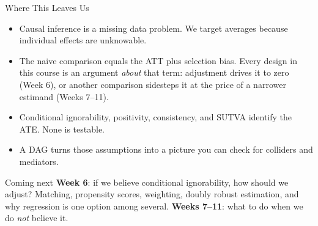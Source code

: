 \documentclass[aspectratio=169,11pt,xcolor=dvipsnames]{beamer}
\begin{document}
\begin{frame}{Where This Leaves Us}
\begin{itemize}\itemsep3pt
  \item Causal inference is a missing data problem. We target averages because
        individual effects are unknowable.
  \item The naive comparison equals the ATT plus selection bias. Every design
        in this course is an argument \emph{about} that term: adjustment
        drives it to zero (Week 6), or another comparison sidesteps it at the
        price of a narrower estimand (Weeks 7--11).
  \item Conditional ignorability, positivity, consistency, and SUTVA identify
        the ATE. \alert{None is testable.}
  \item A DAG turns those assumptions into a picture you can check for
        colliders and mediators.
\end{itemize}
\vskip4pt
\begin{block}{Coming next}
\textbf{Week 6}: if we believe conditional ignorability, how should we adjust?
Matching, propensity scores, weighting, doubly robust estimation, and why
regression is one option among several.
\textbf{Weeks 7--11}: what to do when we do \emph{not} believe it.
\end{block}
\end{frame}
\end{document}
